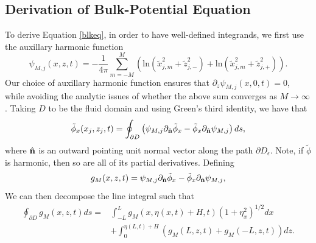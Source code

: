 \documentclass[a4paper,11pt]{article}
\newcommand{\p}{\partial}
\begin{document}
\subsection{Derivation of Bulk-Potential Equation \label{deriv}}
To derive Equation \eqref{blkeq}, in order to have well-defined integrands, we first use the auxillary harmonic function
\[
\psi_{M,j}(x,z,t) = - \frac{1}{4\pi}\sum_{m=-M}^{M} \left( \mbox{ln}\left( \tilde{x}_{j,m}^{2} + \tilde{z}_{j,-}^{2}  \right) + \mbox{ln}\left( \tilde{x}_{j,m}^{2} + \tilde{z}_{j,+}^{2} \right)\right).
\]
Our choice of auxillary harmonic function ensures that $\p_{z}\psi_{M,j}(x,0,t)=0$, while avoiding the analytic issues of whether the above sum converges as $M\rightarrow \infty$.  Taking $D$ to be the fluid domain and using Green's third identity, we have that 
\[
\tilde{\phi}_{x}(x_{j},z_{j},t) =  \oint_{\p D} \left(\psi_{M,j}\p_{\hat{{\bf n}}}\tilde{\phi}_{x}-\tilde{\phi}_{x}\p_{\hat{{\bf n}}}\psi_{M,j} \right) ds,
\]
where $\hat{{\bf n}}$ is an outward pointing unit normal vector along the path $\p D_{\epsilon}$.  Note, if $\tilde{\phi}$ is harmonic, then so are all of its partial derivatives.  Defining
\[
g_{M}(x,z,t) = \psi_{M,j}\p_{\hat{{\bf n}}}\tilde{\phi}_{x}-\tilde{\phi}_{x}\p_{\hat{{\bf n}}}\psi_{M,j},
\]
We can then decompose the line integral such that 
\begin{align*}
\oint_{\p D} g_{M}(x,z,t) ds = & \int_{-L}^{L}g_{M}(x,\eta(x,t)+H,t) (1+\eta_{x}^{2})^{1/2}dx \\
& + \int_{0}^{\eta(L,t)+H} \left(g_{M}(L,z,t) + g_{M}(-L,z,t)\right) dz.  
\end{align*}
\end{document}
